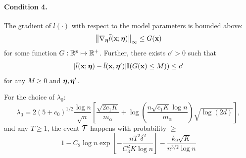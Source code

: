 \documentclass[11pt,letterpaper]{article}
\numberwithin{equation}{section}
\begin{document}
\paragraph{Condition 4.} The gradient of $\bar l(\cdot)$ with respect to the model parameters is bounded above:
%
$$
\left\| \nabla_{\boldsymbol{\eta}} \bar l({\bf{x}}; {\boldsymbol{\eta}}) \right\|_\infty \leq G({\bf{x}})
$$
%
for some function $G: {\mathbb{R}}^p \mapsto {\mathbb{R}}^+$. Further, there exists $c' > 0$ such that
%
$$
| \bar l({\bf{x}}; {\boldsymbol{\eta}}) - \bar l({\bf{x}}, {\boldsymbol{\eta}}')| {\mathbb{I}}(G({\bf{x}}) \leq M)) \leq c'
$$
%
for any $M \geq 0$ and ${\boldsymbol{\eta}}, {\boldsymbol{\eta}}'$.

\begin{Theorem}\label{thm:thm2}
For the choice of $\lambda_0$:
%
$$
\lambda_0 = 2 ( 5 + c_0 )^{1/2} \frac{\log n}{\sqrt n} \left[ \frac{ \sqrt{2 c_1 K}}{m_\alpha} + 
\log \left( \frac{n \sqrt{c_1 K} \log n}{m_\alpha} \right) \sqrt{ \log (2d)} \right],
$$
%
and any $T \geq 1$, the event ${\cal{T}}$ happens with probability $\geq$
%
$$
1 - C_2 \log n \exp \left[ - \frac{n T^2 \delta^2 }{ C_3^2 K \log n} \right] -
\frac{k_9 \sqrt{K}}{n^{3/2} \log n}
$$
\end{Theorem}
\end{document}
